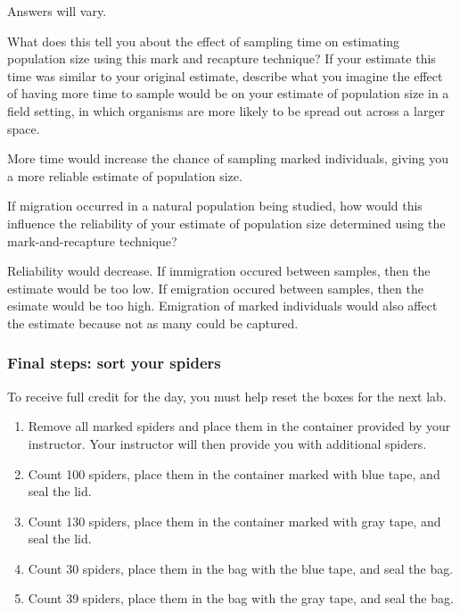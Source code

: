 \documentclass[12pt, hidelinks]{exam}
\newcommand*\AnswerBox[2]{%
    \parbox[t][#1]{0.92\textwidth}{%
    \begin{solution}#2\end{solution}}
    \vspace{\stretch{1}}
}
\newlength{\basespace}
\begin{document}
\begin{questions}
\AnswerBox{\basespace}{Answers will vary.}

\newpage

\question[Checkout]
What does this tell you about the effect of sampling time on estimating
population size using this mark and recapture technique? If your estimate this time was
similar to your original estimate, describe what you imagine the effect
of having more time to sample would be on your estimate of population
size in a field setting, in which organisms are more likely to be spread
out across a larger space.

\AnswerBox{\basespace}{More time would increase the chance of sampling marked individuals, giving you a more reliable estimate of population size.}


\question[Checkout]
If migration occurred in a natural population being studied, how
would this influence the reliability of your estimate of population size
determined using the mark-and-recapture technique?

\AnswerBox{\basespace}{Reliability would decrease. If immigration occured between samples, then the estimate would be too low. If emigration occured between samples, then the esimate would be too high. Emigration of marked individuals would also affect the estimate because not as many could be captured.}

\subsubsection*{Final steps: sort your spiders}

To receive full credit for the day, you must help reset the boxes for the next lab.

\begin{enumerate}
	\item Remove all marked spiders and place them in the container provided by your instructor. Your instructor will then provide you with additional spiders.
	
	\item Count 100 spiders, place them in the container marked with blue tape, and seal the lid. 
	
	\item Count 130 spiders, place them in the container marked with gray tape, and seal the lid.
	
	\item Count 30 spiders, place them in the bag with the blue tape, and seal the bag.
	
	\item Count 39 spiders, place them in the bag with the gray tape, and seal the bag.
	

\end{enumerate}
\end{questions}
\end{document}
